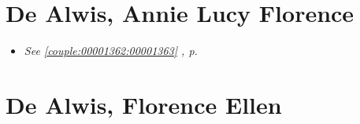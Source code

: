 \documentclass[10pt, openany]{book}
\begin{document}
\chapter{De Alwis, Annie Lucy Florence}
\label{00001363}
\textcolor{slmaroon}{\textit{}}
\begin{itemize}
\item{\textcolor{slteal}{\textit{See  \autoref{couple:00001362:00001363} \textit{, p. \pageref{couple:00001362:00001363} }}}}
\end{itemize}
    
\chapter{De Alwis, Florence Ellen}
\label{00001592}
\textcolor{slmaroon}{\textit{}}
\end{document}
